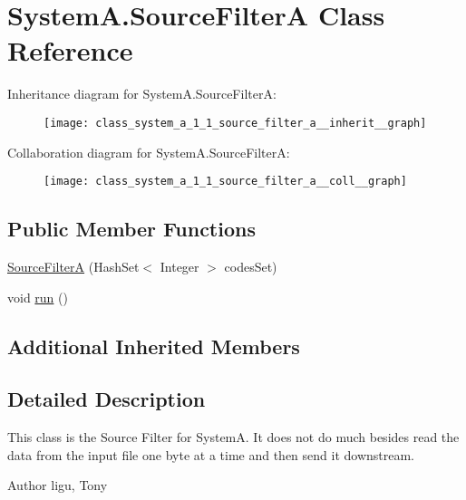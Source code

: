 \hypertarget{class_system_a_1_1_source_filter_a}{}\section{System\+A.\+Source\+Filter\+A Class Reference}
\label{class_system_a_1_1_source_filter_a}


Inheritance diagram for System\+A.\+Source\+Filter\+A\+:
\nopagebreak
\begin{figure}[H]
\begin{center}
\leavevmode
\texttt{[image: class\_system\_a\_1\_1\_source\_filter\_a\_\_inherit\_\_graph]}
\end{center}
\end{figure}


Collaboration diagram for System\+A.\+Source\+Filter\+A\+:
\nopagebreak
\begin{figure}[H]
\begin{center}
\leavevmode
\texttt{[image: class\_system\_a\_1\_1\_source\_filter\_a\_\_coll\_\_graph]}
\end{center}
\end{figure}
\subsection*{Public Member Functions}
\begin{DoxyCompactItemize}
\item 
\hyperlink{class_system_a_1_1_source_filter_a_a8cca3e9d326c13986c466b5e6dc3c148}{Source\+Filter\+A} (Hash\+Set$<$ Integer $>$ codes\+Set)
\item 
void \hyperlink{class_system_a_1_1_source_filter_a_a8fbf98238a85ec30488c9117819df20b}{run} ()
\end{DoxyCompactItemize}
\subsection*{Additional Inherited Members}


\subsection{Detailed Description}
This class is the Source Filter for System\+A. It does not do much besides read the data from the input file one byte at a time and then send it downstream. \begin{DoxyAuthor}{Author}
ligu, Tony 
\end{DoxyAuthor}


